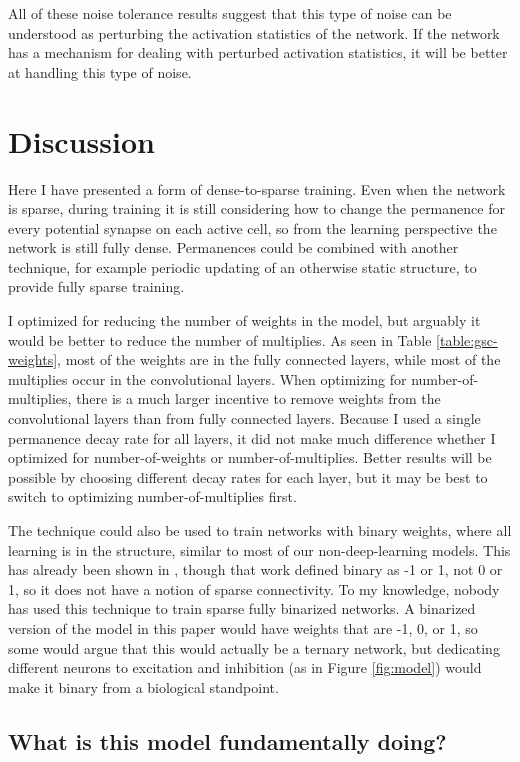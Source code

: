 \documentclass[11pt]{article}
\begin{document}
All of these noise tolerance results suggest that this type of noise can be understood as perturbing the activation statistics of the network. If the network has a mechanism for dealing with perturbed activation statistics, it will be better at handling this type of noise.

\section{Discussion}
\label{sec:orgde2512d}

Here I have presented a form of dense-to-sparse training. Even when the network is sparse, during training it is still considering how to change the permanence for every potential synapse on each active cell, so from the learning perspective the network is still fully dense. Permanences could be combined with another technique, for example periodic updating of an otherwise static structure, to provide fully sparse training.

I optimized for reducing the number of weights in the model, but arguably it would be better to reduce the number of multiplies. As seen in Table \ref{table:gsc-weights}, most of the weights are in the fully connected layers, while most of the multiplies occur in the convolutional layers. When optimizing for number-of-multiplies, there is a much larger incentive to remove weights from the convolutional layers than from fully connected layers. Because I used a single permanence decay rate for all layers, it did not make much difference whether I optimized for number-of-weights or number-of-multiplies. Better results will be possible by choosing different decay rates for each layer, but it may be best to switch to optimizing number-of-multiplies first.

The technique could also be used to train networks with binary weights, where all learning is in the structure, similar to most of our non-deep-learning models. This has already been shown in \citep{courbariaux2016binarized}, though that work defined binary as -1 or 1, not 0 or 1, so it does not have a notion of sparse connectivity. To my knowledge, nobody has used this technique to train sparse fully binarized networks. A binarized version of the model in this paper would have weights that are -1, 0, or 1, so some would argue that this would actually be a ternary network, but dedicating different neurons to excitation and inhibition (as in Figure \ref{fig:model}) would make it binary from a biological standpoint.


\subsection{What is this model fundamentally doing?}
\label{sec:orge5060c3}
\end{document}
